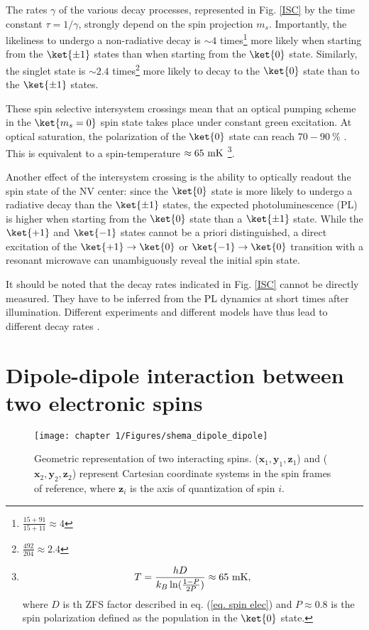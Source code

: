 \documentclass[a4paper, 11pt]{report}
\begin{document}
The rates $\gamma$ of the various decay processes, represented in Fig. \ref{ISC} by the time constant $\tau=1/\gamma$, strongly depend on the spin projection $m_s$. Importantly, the likeliness to undergo a non-radiative decay is $\sim 4$ times\footnote{$\frac{15+91}{15+11}\approx 4$} more likely when starting from the $\ket{\pm 1}$ states than when starting from the $\ket{0}$ state. Similarly, the singlet state is $\sim 2.4$ times\footnote{$\frac{492}{204} \approx 2.4$} more likely to decay to the $\ket{0}$ state than to the $\ket{\pm 1}$ states.

These spin selective intersystem crossings mean that an optical pumping scheme in the $\ket{m_s=0}$ spin state takes place under constant green excitation. At optical saturation, the polarization of the $\ket{0}$ state can reach $70-90\ \%$ \citep{gupta2016efficient}. This is equivalent to a spin-temperature $\approx 65\ \rm mK$ \footnote{\begin{equation*}
T=\frac{h D}{k_B \ln (\frac{1-P}{2P})} \approx 65\ \rm mK,
\end{equation*}
where $D$ is th ZFS factor described in eq. (\ref{eq. spin elec}) and $P\approx 0.8$ is the spin polarization defined as the population in the $\ket{0}$ state.}.

Another effect of the intersystem crossing is the ability to optically readout the spin state of the NV center: since the $\ket{0}$ state is more likely to undergo a radiative decay than the $\ket{\pm 1}$ states, the expected photoluminescence (PL) is higher when starting from the $\ket{0}$ state than a $\ket{\pm 1}$ state. While the $\ket{+1}$ and $\ket{-1}$ states cannot be a priori distinguished, a direct excitation of the $\ket{+1} \to \ket{0}$ or $\ket{-1} \to \ket{0}$ transition with a resonant microwave can unambiguously reveal the initial spin state.

It should be noted that the decay rates indicated in Fig. \ref{ISC} cannot be directly measured. They have to be inferred from the PL dynamics at short times after illumination. Different experiments and different models have thus lead to different decay rates \citep{duarte2021effect}. 

\section{Dipole-dipole interaction between two electronic spins}

\begin{figure}[h!]
\centering
\texttt{[image: chapter 1/Figures/shema\_dipole\_dipole]}
\caption{Geometric representation of two interacting spins. ($\mathbf{x}_1,\mathbf{y}_1,\mathbf{z}_1$) and ($\mathbf{x}_2,\mathbf{y}_2,\mathbf{z}_2$) represent Cartesian coordinate systems in the spin frames of reference, where $\mathbf{z}_i$ is the axis of quantization of spin $i$.} 
\label{dipole-dipole}
\end{figure}
\end{document}
